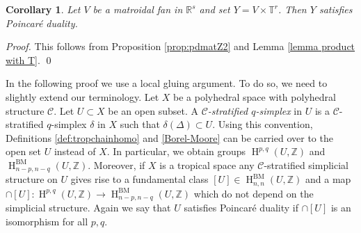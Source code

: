 \documentclass[11pt]{article}
\numberwithin{equation}{numsection}
\newcommand{\Z}{{\mathbb Z}}
\newcommand{\CC}{{\mathcal C}}
\newcommand{\R}{{\mathbb R}}
\newcommand{\T}{{\mathbb T}}
\DeclareMathOperator{\BM}{BM}
\DeclareMathOperator{\HH}{H}
\newtheorem{cor}[thm]{Corollary}
\begin{document}
\begin{cor}\label{prop:pdmatZ}
Let $V$ be a  matroidal fan  in $\R^s$ and set $Y = V \times \T^r$. 
Then $Y$ satisfies Poincar\'e duality. 
\end{cor}

\begin{proof}
  This follows from Proposition \ref{prop:pdmatZ2} and Lemma \ref{lemma product with T}.
  \qed
\end{proof}


\begin{rem} {\rm
 In the following proof we use a local gluing argument. 
To do so, we need to slightly extend our terminology. 
Let $X$ be a polyhedral space with polyhedral structure $\CC$.
Let $U \subset X$ be an open subset. 
A \emph{$\CC$-stratified $q$-simplex} in $U$ is a $\CC$-stratified $q$-simplex $\delta$ in $X$
such that $\delta(\Delta) \subset U$.
Using this convention, Definitions \ref{def:tropchainhomo} and \ref{Borel-Moore} 
can be carried over to  the open set $U$ instead of $X$. 
In particular, we obtain groups $\HH^{p,q}(U, \Z)$ and $\HH^{\BM}_{n-p,n-q}(U, \Z)$. 
Moreover, if $X$ is a tropical space any $\CC$-stratified simplicial structure on $U$ gives rise to a fundamental class
$[U] \in \HH^{\BM}_{n,n}(U, \Z)$ and a map $\cap [U] \colon \HH^{p,q}(U, \Z) \to \HH^{\BM}_{n-p,n-q}(U, \Z)$ 
which do not depend on the simplicial structure. 
Again we say that $U$ satisfies Poincar\'e duality if $\cap [U]$ is an isomorphism for all $p,q$.}
\end{rem}
\end{document}
